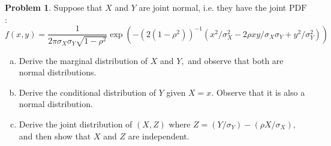 \documentclass{article}
\theoremstyle{definition}
\newtheorem{problem}{Problem}
\begin{document}
\begin{problem}
Suppose that $X$ and $Y$ are joint normal, i.e. they have the joint $\mathrm{PDF}$ :
$$
f(x, y)=\frac{1}{2 \pi \sigma_{X} \sigma_{Y} \sqrt{1-\rho^{2}}} \exp \left(-\left(2\left(1-\rho^{2}\right)\right)^{-1}\left(x^{2} / \sigma_{X}^{2}-2 \rho x y / \sigma_{X} \sigma_{Y}+y^{2} / \sigma_{Y}^{2}\right)\right)
$$

\begin{enumerate}[(a)]
    \item Derive the marginal distribution of $X$ and $Y,$ and observe that both are normal distributions.
    \item Derive the conditional distribution of $Y$ given $X=x .$ Observe that it is also a normal distribution.
    \item Derive the joint distribution of $(X, Z)$ where $Z=\left(Y / \sigma_{Y}\right)-\left(\rho X / \sigma_{X}\right),$ and then show that $X$ and $Z$ are independent.
\end{enumerate}

\end{problem}
\end{document}

